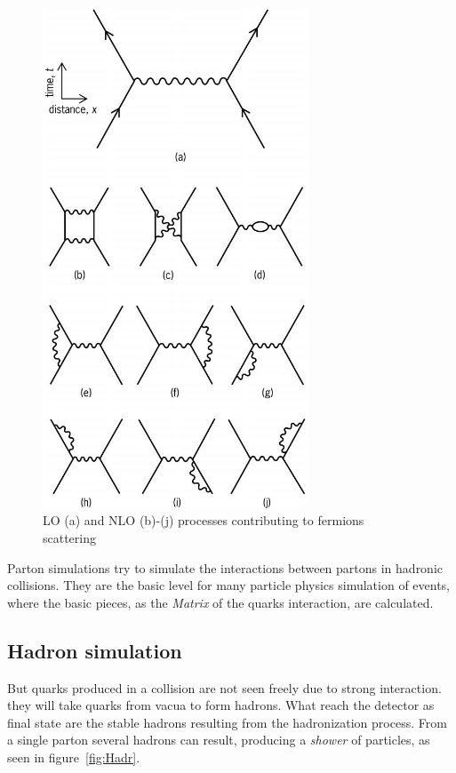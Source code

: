 \begin{figure}[!Hhtbp]
  \begin{center}
    \includegraphics[width=0.7\textwidth]{figs/Feynman_diagrams.jpg}
    \caption{LO (a) and NLO (b)-(j) processes contributing to fermions scattering}
    \label{fig:LOpNLO}
  \end{center}
\end{figure}

Parton simulations try to simulate the interactions between partons in hadronic collisions. They are the basic level for many particle physics simulation of events, where the basic pieces, as the \textit{Matrix} of the quarks interaction, are calculated.

\subsection{Hadron simulation}
\label{sec:hadron}

But quarks produced in a collision are not seen freely due to strong interaction. they will take quarks from vacua to form hadrons. What reach the detector as final state are the stable hadrons resulting from the hadronization process. From a single parton several hadrons can result, producing a \textit{shower} of particles, as seen in figure~\ref{fig:Hadr}. 

